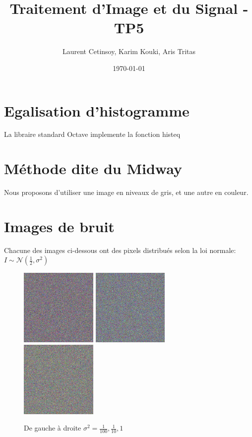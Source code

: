 \documentclass{article}
\title{Traitement d'Image et du Signal - TP5}
\author{Laurent Cetinsoy, Karim Kouki, Aris Tritas }
\date{\today}
\begin{document}
\maketitle

\section{Egalisation d'histogramme}
La libraire standard Octave implemente la fonction \textsf{histeq} 
\section{Méthode dite du Midway}
Nous proposons d'utiliser une image en niveaux de gris, et une autre en couleur.

\section{Images de bruit}
Chacune des images ci-dessous ont des pixels distribués selon la loi normale: $I \sim \mathcal{N}(\frac{1}{2}, \sigma^2)$

\begin{figure}[h]
	\includegraphics[width=0.33\textwidth]{noise001.png}
	\includegraphics[width=0.33\textwidth]{noise01.png}
	\includegraphics[width=0.33\textwidth]{noise10.png}
  \caption{De gauche à droite $\sigma^2 = \frac{1}{100}, \frac{1}{10}, 1$}
\end{figure}
\end{document}
